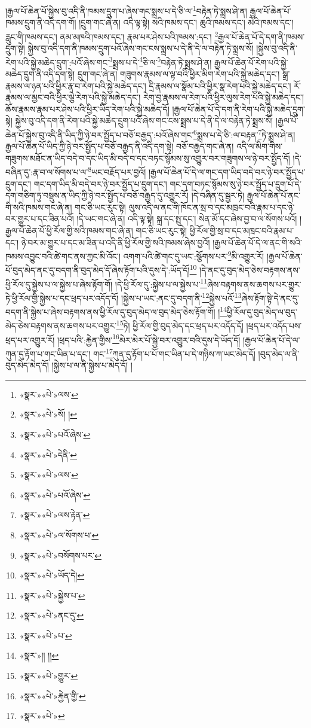 །རྒྱལ་པོ་ཆེན་པོ་སྐྱེས་བུ་འདི་ནི་ཁམས་དྲུག་པ་ཞེས་གང་སྨྲས་པ་དེ་ཅི་ལ་\footnote{«སྣར་»«པེ་»ལས་}བརྟེན་ཏེ་སྨྲས་ཤེ་ན། རྒྱལ་པོ་ཆེན་པོ་ཁམས་དྲུག་ནི་འདི་དག་གོ། །དྲུག་གང་ཞེ་ན། འདི་ལྟ་སྟེ། སའི་ཁམས་དང་། ཆུའི་ཁམས་དང་། མེའི་ཁམས་དང་། རླུང་གི་ཁམས་དང་། ནམ་མཁའི་ཁམས་དང་། རྣམ་པར་ཤེས་པའི་ཁམས་:དང་། \footnote{«སྣར་»«པེ་»སོ། ། }རྒྱལ་པོ་ཆེན་པོ་དེ་དག་ནི་ཁམས་དྲུག་སྟེ། སྐྱེས་བུ་འདི་དག་ནི་ཁམས་དྲུག་པའོ་ཞེས་གང་ངས་སྨྲས་པ་དེ་ནི་དེ་ལ་བརྟེན་ཏེ་སྨྲས་སོ། །སྐྱེས་བུ་འདི་ནི་རེག་པའི་སྐྱེ་མཆེད་དྲུག་:པའོ་ཞེས་གང་\footnote{«སྣར་»«པེ་»པའོ་ཞེས་}སྨྲས་པ་དེ་\footnote{«སྣར་»«པེ་»དེནི་}ཅི་ལ་\footnote{«སྣར་»«པེ་»ལས་}བརྟེན་ཏེ་སྨྲས་ཤེ་ན། རྒྱལ་པོ་ཆེན་པོ་རེག་པའི་སྐྱེ་མཆེད་དྲུག་ནི་འདི་དག་སྟེ། དྲུག་གང་ཞེ་ན། གཟུགས་རྣམས་ལ་ལྟ་བའི་ཕྱིར་མིག་རེག་པའི་སྐྱེ་མཆེད་དང་། སྒྲ་རྣམས་ལ་ཉན་པའི་ཕྱིར་རྣ་བ་རེག་པའི་སྐྱེ་མཆེད་དང་། དྲི་རྣམས་ལ་སྣོམ་པའི་ཕྱིར་སྣ་རེག་པའི་སྐྱེ་མཆེད་དང་། རོ་རྣམས་ལ་མྱང་བའི་ཕྱིར་ལྕེ་རེག་པའི་སྐྱེ་མཆེད་དང་། རེག་བྱ་རྣམས་ལ་རེག་པའི་ཕྱིར་ལུས་རེག་པའི་སྐྱེ་མཆེད་དང་། ཆོས་རྣམས་རྣམ་པར་ཤེས་པའི་ཕྱིར་ཡིད་རེག་པའི་སྐྱེ་མཆེད་དོ། །རྒྱལ་པོ་ཆེན་པོ་དེ་དག་ནི་རེག་པའི་སྐྱེ་མཆེད་དྲུག་སྟེ། སྐྱེས་བུ་འདི་དག་ནི་རེག་པའི་སྐྱེ་མཆེད་དྲུག་པའོ་ཞེས་གང་ངས་སྨྲས་པ་དེ་ནི་དེ་ལ་བརྟེན་ཏེ་སྨྲས་སོ། །རྒྱལ་པོ་ཆེན་པོ་སྐྱེས་བུ་འདི་ནི་ཡིད་ཀྱི་ཉེ་བར་སྤྱོད་པ་བཅོ་བརྒྱད་:པའོ་ཞེས་གང་\footnote{«སྣར་»«པེ་»པའོ་ཞེས་}སྨྲས་པ་དེ་ཅི་:ལ་བརྟན་\footnote{«སྣར་»«པེ་»ལས་རྟེན་}ཏེ་སྨྲས་ཤེ་ན། རྒྱལ་པོ་ཆེན་པོ་ཡིད་ཀྱི་ཉེ་བར་སྤྱོད་པ་བཅོ་བརྒྱད་ནི་འདི་དག་སྟེ། བཅོ་བརྒྱད་གང་ཞེ་ན། འདི་ལ་མིག་གིས་གཟུགས་མཐོང་ན་ཡིད་བདེ་བ་དང་ཡིད་མི་བདེ་བ་དང་བཏང་སྙོམས་སུ་འགྱུར་བར་གཟུགས་ལ་ཉེ་བར་སྤྱོད་དོ། །དེ་བཞིན་དུ་:རྣ་བ་ལ་སོགས་པ་ལ་\footnote{«སྣར་»«པེ་»ལ་སོགས་པ་}ཡང་བརྗོད་པར་བྱའོ། །རྒྱལ་པོ་ཆེན་པོ་དེ་ལ་གང་དག་ཡིད་བདེ་བར་ཉེ་བར་སྤྱོད་པ་དྲུག་དང་། གང་དག་ཡིད་མི་བདེ་བར་ཉེ་བར་སྤྱོད་པ་དྲུག་དང་། གང་དག་བཏང་སྙོམས་སུ་ཉེ་བར་སྤྱོད་པ་དྲུག་པོ་དེ་དག་གཅིག་ཏུ་བསྡུས་ན་ཡིད་ཀྱི་ཉེ་བར་སྤྱོད་པ་བཅོ་བརྒྱད་དུ་འགྱུར་རོ། །དེ་བཞིན་དུ་སྦྱར་ཏེ། རྒྱལ་པོ་ཆེན་པོ་ནང་གི་སའི་ཁམས་གང་ཞེ་ན། གང་ཅི་ཡང་རུང་སྟེ། ལུས་འདི་ལ་ནང་གི་ཁོང་ན་སྲ་བ་དང་མཁྲང་བའི་རྣམ་པ་དང་ཉེ་བར་གྱུར་པ་དང་ཟིན་པའོ། །དེ་ཡང་གང་ཞེ་ན། འདི་ལྟ་སྟེ། སྐྲ་དང་སྤུ་དང་། སེན་མོ་དང་ཞེས་བྱ་བ་ལ་སོགས་པའོ། །རྒྱལ་པོ་ཆེན་པོ་ཕྱི་རོལ་གྱི་སའི་ཁམས་གང་ཞེ་ན། གང་ཅི་ཡང་རུང་སྟེ། ཕྱི་རོལ་གྱི་སྲ་བ་དང་མཁྲང་བའི་རྣམ་པ་དང་། ཉེ་བར་མ་གྱུར་པ་དང་མ་ཟིན་པ་འདི་ནི་ཕྱི་རོལ་གྱི་སའི་ཁམས་ཞེས་བྱའོ། །རྒྱལ་པོ་ཆེན་པོ་དེ་ལ་ནང་གི་སའི་ཁམས་འབྱུང་བའི་ཚེ་གང་ནས་ཀྱང་མི་འོང་། འགག་པའི་ཚེ་གང་དུ་ཡང་:སྩོགས་པར་\footnote{«སྣར་»«པེ་»བསོགས་པར་}མི་འགྱུར་རོ། །རྒྱལ་པོ་ཆེན་པོ་བུད་མེད་ནང་དུ་བདག་ནི་བུད་མེད་དོ་ཞེས་རྟོག་པའི་དུས་དེ་:ཡོད་དོ།\footnote{«སྣར་»«པེ་»ཡོད་དེ།} །དེ་ནང་དུ་བུད་མེད་ཅེས་བརྟགས་ནས་ཕྱི་རོལ་དུ་སྐྱེས་པ་ལ་སྐྱེས་པ་ཞེས་རྟོག་གོ། །དེ་ཕྱི་རོལ་དུ་:སྐྱེས་པ་ལ་སྐྱེས་པ་\footnote{«སྣར་»«པེ་»སྐྱེས་པ་}ཞེས་བརྟགས་ནས་ཆགས་པར་གྱུར་ཏེ་ཕྱི་རོལ་གྱི་སྐྱེས་པ་དང་ཕྲད་པར་འདོད་དོ། །སྐྱེས་པ་ཡང་:ནང་དུ་བདག་ནི་\footnote{«སྣར་»«པེ་»ནང་དུ་}སྐྱེས་པའོ་\footnote{«སྣར་»«པེ་»པ་}ཞེས་རྟོག་སྟེ་དེ་ནང་དུ་བདག་ནི་སྐྱེས་པ་ཞེས་བརྟགས་ནས་ཕྱི་རོལ་དུ་བུད་མེད་ལ་བུད་མེད་ཅེས་རྟོག་གོ། །\footnote{«སྣར་»།། །།}ཕྱི་རོལ་དུ་བུད་མེད་ལ་བུད་མེད་ཅེས་བརྟགས་ནས་ཆགས་པར་འགྱུར་\footnote{«སྣར་»«པེ་»གྱུར་}ཏེ། ཕྱི་རོལ་གྱི་བུད་མེད་དང་ཕྲད་པར་འདོད་དོ། །ཕྲད་པར་འདོད་པས་ཕྲད་པར་འགྱུར་རོ། །ཕྲད་པའི་:རྐྱེན་གྱིས་\footnote{«སྣར་»«པེ་»རྐྱེན་གྱི་}མེར་མེར་པོ་སྐྱེ་བར་འགྱུར་བའི་དུས་དེ་ཡོད་དོ། །རྒྱལ་པོ་ཆེན་པོ་དེ་ལ་ཀུན་དུ་རྟོག་པ་གང་ཡིན་པ་དང་། གང་\footnote{«སྣར་»«པེ་»}ཀུན་དུ་རྟོག་པ་པོ་གང་ཡིན་པ་དེ་གཉིས་ཀ་ཡང་མེད་དོ། །བུད་མེད་ལ་ནི་བུད་མེད་མེད་དོ། །སྐྱེས་པ་ལ་ནི་སྐྱེས་པ་མེད་དོ། །
